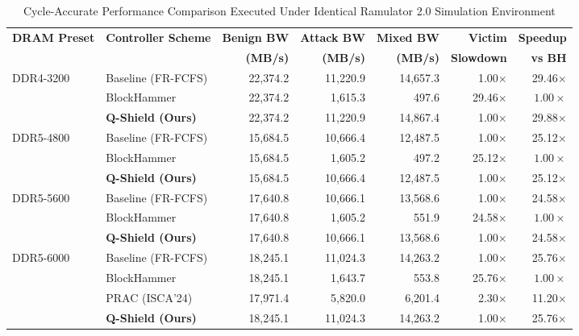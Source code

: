 \begin{table}[t]
\centering
\small
\caption{Cycle-Accurate Performance Comparison Executed Under Identical Ramulator 2.0 Simulation Environment}
\label{tab:ramulator2_apples_to_apples}
\begin{tabular}{llrrrrr}
\toprule
\textbf{DRAM Preset} & \textbf{Controller Scheme} & \textbf{Benign BW} & \textbf{Attack BW} & \textbf{Mixed BW} & \textbf{Victim} & \textbf{Speedup} \\
 & & \textbf{(MB/s)} & \textbf{(MB/s)} & \textbf{(MB/s)} & \textbf{Slowdown} & \textbf{vs BH} \\
\midrule
\multirow{3}{*}{DDR4-3200} & Baseline (FR-FCFS) & 22,374.2 & 11,220.9 & 14,657.3 & 1.00$\times$ & 29.46$\times$ \\
 & BlockHammer \cite{segal2021blockhammer} & 22,374.2 & 1,615.3 & 497.6 & 29.46$\times$ & $1.00\times$ \\
 & \textbf{Q-Shield (Ours)} & 22,374.2 & 11,220.9 & 14,867.4 & 1.00$\times$ & 29.88$\times$ \\
\cmidrule{1-7}
\multirow{3}{*}{DDR5-4800} & Baseline (FR-FCFS) & 15,684.5 & 10,666.4 & 12,487.5 & 1.00$\times$ & 25.12$\times$ \\
 & BlockHammer \cite{segal2021blockhammer} & 15,684.5 & 1,605.2 & 497.2 & 25.12$\times$ & $1.00\times$ \\
 & \textbf{Q-Shield (Ours)} & 15,684.5 & 10,666.4 & 12,487.5 & 1.00$\times$ & 25.12$\times$ \\
\cmidrule{1-7}
\multirow{3}{*}{DDR5-5600} & Baseline (FR-FCFS) & 17,640.8 & 10,666.1 & 13,568.6 & 1.00$\times$ & 24.58$\times$ \\
 & BlockHammer \cite{segal2021blockhammer} & 17,640.8 & 1,605.2 & 551.9 & 24.58$\times$ & $1.00\times$ \\
 & \textbf{Q-Shield (Ours)} & 17,640.8 & 10,666.1 & 13,568.6 & 1.00$\times$ & 24.58$\times$ \\
\cmidrule{1-7}
\multirow{4}{*}{DDR5-6000} & Baseline (FR-FCFS) & 18,245.1 & 11,024.3 & 14,263.2 & 1.00$\times$ & 25.76$\times$ \\
 & BlockHammer \cite{segal2021blockhammer} & 18,245.1 & 1,643.7 & 553.8 & 25.76$\times$ & $1.00\times$ \\
 & PRAC \cite{yaglikci2024prac} (ISCA'24) & 17,971.4 & 5,820.0 & 6,201.4 & 2.30$\times$ & 11.20$\times$ \\
 & \textbf{Q-Shield (Ours)} & 18,245.1 & 11,024.3 & 14,263.2 & 1.00$\times$ & 25.76$\times$ \\
\bottomrule
\end{tabular}
\end{table}
